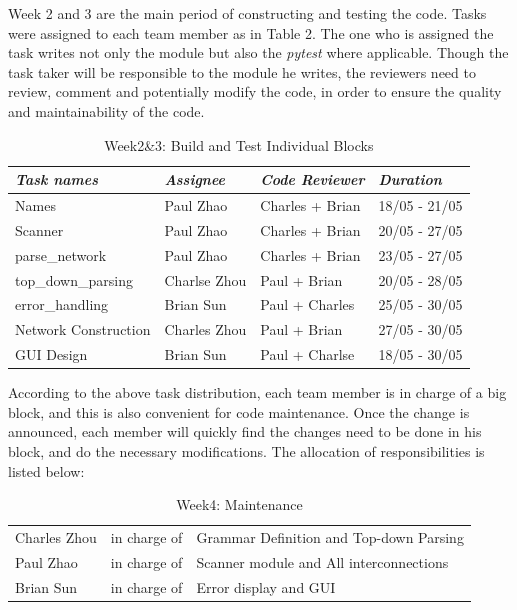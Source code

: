 \documentclass[12pt]{article}
\def\n{\noindent}
\begin{document}
\n Week 2 and 3 are the main period of constructing and testing the code. Tasks were assigned to each team member as in Table 2. The one who is assigned the task writes not only the module but also the \textit{pytest} where applicable. Though the task taker will be responsible to the module he writes, the reviewers need to review, comment and potentially modify the code, in order to ensure the quality and maintainability of the code.

\begin{table}[H]
\begin{tabular}{p{4.5cm}p{3.5cm}p{4cm}p{2.5cm}}
\textit{Task names} & \textit{Assignee} & \textit{Code Reviewer} & \textit{Duration}\\
\hline
Names & Paul Zhao & Charles + Brian & 18/05 - 21/05\\
Scanner & Paul Zhao & Charles + Brian & 20/05 - 27/05\\
parse\_network & Paul Zhao & Charles + Brian & 23/05 - 27/05\\
top\_down\_parsing & Charlse Zhou & Paul + Brian & 20/05 - 28/05\\
error\_handling & Brian Sun & Paul + Charles & 25/05 - 30/05\\
Network Construction & Charles Zhou & Paul + Brian & 27/05 - 30/05\\
GUI Design & Brian Sun & Paul + Charlse & 18/05 - 30/05\\
\end{tabular}
\caption{Week2\&3: Build and Test Individual Blocks}
\end{table}

\n According to the above task distribution, each team member is in charge of a big block, and this is also convenient for code maintenance. Once the change is announced, each member will quickly find the changes need to be done in his block, and do the necessary modifications. The allocation of responsibilities is listed below:
\begin{table}[H]
\begin{tabular}{p{3cm}p{4cm}p{8cm}}
Charles Zhou & in charge of & Grammar Definition and Top-down Parsing\\
Paul Zhao & in charge of & Scanner module and All interconnections\\
Brian Sun & in charge of & Error display and GUI\\
\end{tabular}
\caption{Week4: Maintenance}
\end{table}
\end{document}
